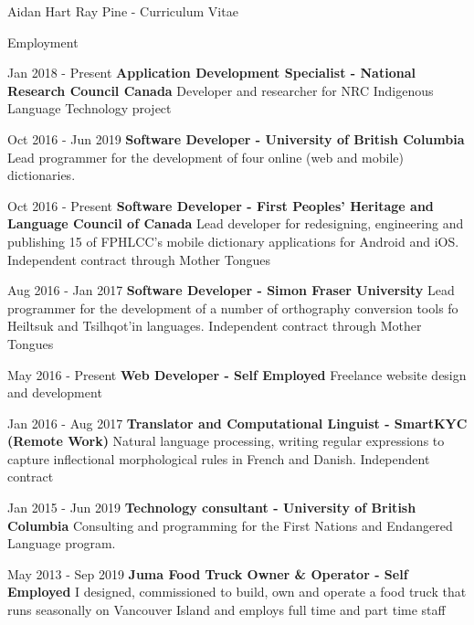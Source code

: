 \documentclass[12pt]{letter}
\begin{document}
\begin{cv}{ Aidan Hart Ray Pine  \space - \space   Curriculum Vitae}
         \begin{cvlist}{Employment}
                            \item[Jan 2018 -  Present ] \textbf{Application Development Specialist - National Research Council Canada}
                \newline Developer and researcher for NRC Indigenous Language Technology project
                            \item[Oct 2016 -  Jun 2019 ] \textbf{Software Developer - University of British Columbia}
                \newline Lead programmer for the development of four online (web and mobile) dictionaries.
                            \item[Oct 2016 -  Present ] \textbf{Software Developer - First Peoples' Heritage and Language Council of Canada}
                \newline Lead developer for redesigning, engineering and publishing 15 of FPHLCC's mobile dictionary applications for Android and iOS. Independent contract through Mother Tongues
                            \item[Aug 2016 -  Jan 2017 ] \textbf{Software Developer - Simon Fraser University}
                \newline Lead programmer for the development of a number of orthography conversion tools fo Heiltsuk and Tsilhqot'in languages. Independent contract through Mother Tongues
                            \item[May 2016 -  Present ] \textbf{Web Developer - Self Employed}
                \newline Freelance website design and development
                            \item[Jan 2016 -  Aug 2017 ] \textbf{Translator and Computational Linguist - SmartKYC (Remote Work)}
                \newline Natural language processing, writing regular expressions to capture inflectional morphological rules in French and Danish. Independent contract
                            \item[Jan 2015 -  Jun 2019 ] \textbf{Technology consultant - University of British Columbia}
                \newline Consulting and programming for the First Nations and Endangered Language program.
                            \item[May 2013 -  Sep 2019 ] \textbf{Juma Food Truck Owner \& Operator - Self Employed}
                \newline I designed, commissioned to build, own and operate a food truck that runs seasonally on Vancouver Island and employs full time and part time staff

\end{cvlist}
\end{cv}
\end{document}
